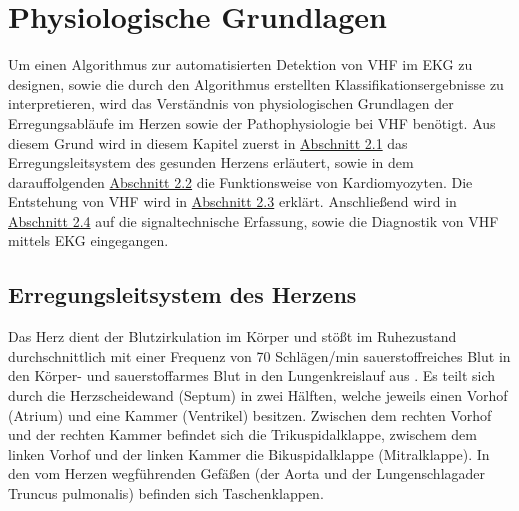 \chapter{Physiologische Grundlagen}\label{chap:Physiologische Grundlagen}


Um einen Algorithmus zur automatisierten Detektion von \gls{VHF} im \gls{EKG} zu designen, sowie die durch den Algorithmus erstellten Klassifikationsergebnisse zu interpretieren, wird das Verständnis von physiologischen Grundlagen der Erregungsabläufe im Herzen sowie der Pathophysiologie bei \gls{VHF} benötigt.
Aus diesem Grund wird in diesem Kapitel zuerst in \hyperref[sec:Erregungsleitsystem]{Abschnitt 2.1} das Erregungsleitsystem des gesunden Herzens erläutert, sowie in dem darauffolgenden \hyperref[sec:myozyten]{Abschnitt 2.2} die Funktionsweise von Kardiomyozyten. Die Entstehung von \gls{VHF} wird in \hyperref[sec:Vorhofflimmern]{Abschnitt 2.3} erklärt. Anschließend wird in \hyperref[sec:DiagVorhofflimmern]{Abschnitt 2.4} auf die signaltechnische Erfassung, sowie die Diagnostik von \gls{VHF} mittels \gls{EKG} eingegangen.


\section{Erregungsleitsystem des Herzens}\label{sec:Erregungsleitsystem}

Das Herz dient der Blutzirkulation im Körper und stößt im Ruhezustand durchschnittlich mit einer Frequenz von 70 Schlägen/min sauerstoffreiches Blut in den Körper- und sauerstoffarmes Blut in den Lungenkreislauf aus \cite{gekle_taschenlehrbuch_2015}. Es teilt sich durch die Herzscheidewand (Septum) in zwei Hälften, welche jeweils einen Vorhof (Atrium) und eine Kammer (Ventrikel) besitzen. Zwischen dem rechten Vorhof und der rechten Kammer befindet sich die Trikuspidalklappe, zwischem dem linken Vorhof und der linken Kammer die Bikuspidalklappe (Mitralklappe). In den vom Herzen wegführenden Gefäßen (der Aorta und der Lungenschlagader Truncus pulmonalis) befinden sich  Taschenklappen.  \cite{zilles_anatomie_2010} 


